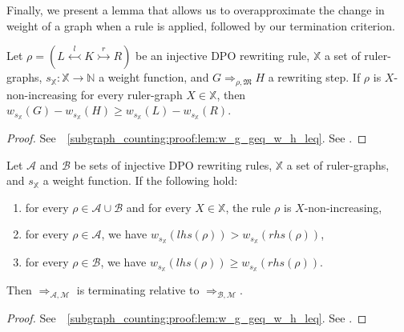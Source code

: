 Finally, we present a lemma that allows us to overapproximate the change in weight of a graph when a rule is applied, followed by our termination criterion. 

\begin{lemma}
    \label{subgraph_counting:lem:w_g_geq_w_h_leq}
    Let $\rho = (L \overset{l}{\leftarrowtail} K \overset{r}{\rightarrowtail} R)$ be an injective DPO rewriting rule,
    \( \mathbb{X} \) a set of ruler-graphs,
    \( s_{\mathbb{X}} \colon \mathbb{X} \to \mathbb{N} \) a weight function,
    and \( G \Rightarrow_{\rho,\mathfrak{M}} H \) a rewriting step. 
    If $\rho$ is \( X \)-non-increasing for every ruler-graph \( X \in \mathbb{X} \), then $
        w_{s_\mathbb{X}}(G) - w_{s_\mathbb{X}}(H) 
        \geq 
        w_{s_\mathbb{X}}(L) - w_{s_\mathbb{X}}(R)
    $.
\end{lemma}
\begin{proof}
    \iflongversion
        See~\textsection~\ref{subgraph_counting:proof:lem:w_g_geq_w_h_leq}.
    \else
        See \cite[Lemma 41]{qiu2025termination}.
    \fi 
\end{proof} 
\begin{theorem}[Termination] 
    \label{subgraph_counting:thm:termination_grs}
    Let \(\mathcal{A}\) and \(\mathcal{B}\) be sets of injective DPO rewriting rules, $\mathbb{X}$ a set of ruler-graphs, and $s_\mathbb{X}$ a weight function. If the following hold:
    \begin{enumerate}
        \item  for every $\rho \in \mathcal{A} \cup \mathcal{B}$ and for every $X \in \mathbb{X}$, the rule $\rho$ is $X$-non-increasing,
        \item for every \(\rho \in \mathcal{A}\), we have \( w_{s_\mathbb{X}}(lhs(\rho)) > w_{s_\mathbb{X}}(rhs(\rho)) \),
        \item for every \(\rho \in \mathcal{B}\), we have \( w_{s_\mathbb{X}}(lhs(\rho)) \geq w_{s_\mathbb{X}}(rhs(\rho)) \).
    \end{enumerate}
    Then \(\Rightarrow_{\mathcal{A},\mathcal{M}}\) is terminating relative to \(\Rightarrow_{\mathcal{B},\mathcal{M}}\).
\end{theorem}
\begin{proof}
    \iflongversion
        See~\textsection~\ref{subgraph_counting:proof:lem:w_g_geq_w_h_leq}.
    \else
        See \cite[Lemma 41]{qiu2025termination}.
    \fi 
\end{proof} 